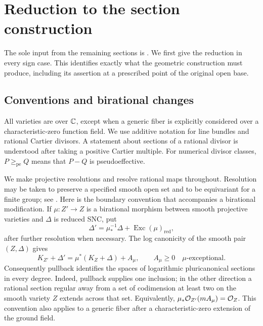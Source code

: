 \section{Reduction to the section construction}\label{sec:completion}

The sole input from the remaining sections is
. We first give the reduction in every
sign case. This identifies exactly what the geometric construction must
produce, including its assertion at a prescribed point of the original
open base.

\subsection{Conventions and birational changes}
All varieties are over $\mathbb C$, except when a generic fiber is explicitly
considered over a characteristic-zero function field.  We use additive
notation for line bundles and rational Cartier divisors.  A statement about
sections of a rational divisor is understood after taking a positive
Cartier multiple.  For numerical divisor classes, $P\ge_{\mathrm{pe}}Q$
means that $P-Q$ is pseudoeffective.

We make projective resolutions and resolve rational maps throughout.
Resolution may be taken to preserve a specified smooth open set and to be
equivariant for a finite group; see
\cite[Theorems 3.35 and 3.36]{KollarResolution}.
Here is the boundary convention that accompanies a birational
modification.  If $\mu:Z'\to Z$ is a birational morphism between smooth
projective varieties and $\Delta$ is reduced SNC, put
\[
 \Delta'=\mu^{-1}_*\Delta+\operatorname{Exc}(\mu)_{\mathrm{red}},
\]
after further resolution when necessary.  The log canonicity of the
smooth pair $(Z,\Delta)$ gives
\begin{equation}\label{eq:prelim-birational-log}
 K_{Z'}+\Delta'=\mu^*(K_Z+\Delta)+A_\mu,
 \qquad A_\mu\geq0\quad\text{$\mu$-exceptional}.
\end{equation}
Consequently pullback identifies the spaces of logarithmic pluricanonical
sections in every degree.  Indeed, pullback supplies one inclusion; in the
other direction a rational section regular away from a set of codimension
at least two on the smooth variety $Z$ extends across that set.  Equivalently,
$\mu_*\mathcal O_{Z'}(mA_\mu)=\mathcal O_Z$.  This convention also applies to a generic
fiber after a characteristic-zero extension of the ground field.

